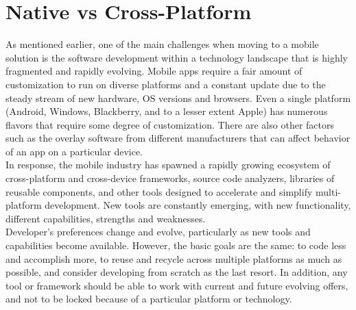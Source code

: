 \section{Native vs Cross-Platform}
As mentioned earlier, one of the main challenges when moving to a mobile solution is the software development within a technology landscape that is highly fragmented and rapidly evolving. Mobile apps require a fair amount of customization to run on diverse platforms and a constant update due to the steady stream of new hardware, OS versions and browsers. Even a single platform (Android, Windows, Blackberry, and to a lesser extent Apple) has numerous flavors that require some degree of customization. There are also other factors such as the overlay software from different manufacturers that can affect behavior of an app on a particular device.\\
In response, the mobile industry has spawned a rapidly growing ecosystem of cross-platform and cross-device frameworks, source code analyzers, libraries of reusable components, and other tools designed to accelerate and simplify multi-platform development. New tools are constantly emerging, with new functionality, different capabilities,  strengths and weaknesses.\\
Developer’s preferences change and evolve, particularly as new tools and capabilities become available. However, the basic goals are the same: to code less and accomplish more, to reuse and recycle across multiple platforms as much as possible, and consider developing from scratch as the last resort. In addition, any tool or framework should be able to work with current and future evolving offers, and not to be locked because of a particular platform or technology.\cite{ref7}

